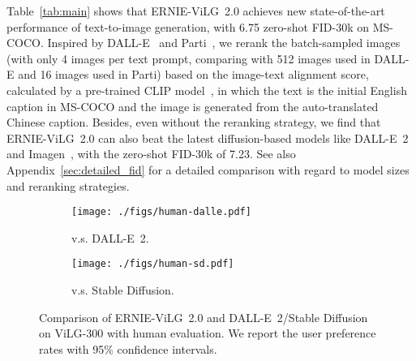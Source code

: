 \documentclass[10pt,twocolumn,letterpaper]{article}
\begin{document}
Table~\ref{tab:main} shows that ERNIE-ViLG~2.0 achieves new state-of-the-art  performance of text-to-image generation, with 6.75 zero-shot FID-30k on MS-COCO. 
Inspired by DALL-E~\cite{DBLP:conf/icml/RameshPGGVRCS21} and Parti~\cite{DBLP:journals/corr/abs-2206-10789},
we rerank the batch-sampled images (with only 4 images per text prompt, comparing with 512 images used in DALL-E and 16 images used in Parti) based on the image-text alignment score, calculated by a pre-trained CLIP model~\cite{DBLP:conf/icml/RadfordKHRGASAM21}, in which the text is the initial English caption in MS-COCO and the image is generated from the auto-translated Chinese caption.
Besides, even without the reranking strategy, we find that ERNIE-ViLG~2.0 can also beat the latest diffusion-based models like DALL-E~2~\cite{DBLP:journals/corr/abs-2204-06125} and Imagen~\cite{DBLP:journals/corr/abs-2205-11487}, with the zero-shot FID-30k of 7.23. 
See also Appendix~\ref{sec:detailed_fid} for a detailed comparison with regard to model sizes and reranking strategies.


\begin{figure}
  \centering
  \begin{subfigure}{0.49\linewidth}
    \texttt{[image: ./figs/human-dalle.pdf]}
    \caption{v.s. DALL-E~2.}
    \label{fig:human_dalle}
  \end{subfigure}
  \begin{subfigure}{0.49\linewidth}
    \texttt{[image: ./figs/human-sd.pdf]}
    \caption{v.s. Stable Diffusion.}
    \label{fig:human_sd}
  \end{subfigure}
    \caption{Comparison of ERNIE-ViLG~2.0 and DALL-E~2/Stable Diffusion on ViLG-300 with human evaluation. We report the user preference rates with 95\% confidence intervals.}
  \label{fig:human}
\end{figure}
\end{document}

